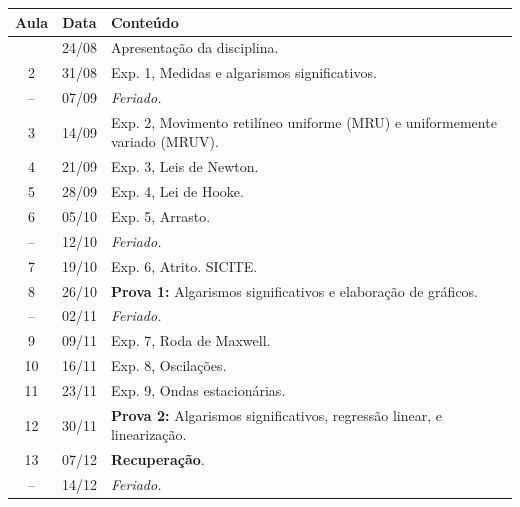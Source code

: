 \begin{center}
\begin{longtable}{ccp{70mm}}
\toprule
Aula & Data & Conteúdo \\
\midrule
\endhead
\bottomrule
\endfoot
  1 & 24/08 & Apresentação da disciplina. \\
  2 & 31/08 & Exp. 1, Medidas e algarismos significativos. \\
 -- & 07/09 & \emph{Feriado.} \\
  3 & 14/09 & Exp. 2, Movimento retilíneo uniforme (MRU) e uniformemente variado (MRUV). \\
  4 & 21/09 & Exp. 3, Leis de Newton. \\
  5 & 28/09 & Exp. 4, Lei de Hooke. \\
  6 & 05/10 & Exp. 5, Arrasto. \\
 -- & 12/10 & \emph{Feriado.} \\
  7 & 19/10 & Exp. 6, Atrito. SICITE. \\
  8 & 26/10 & \textbf{Prova 1:} Algarismos significativos e elaboração de gráficos. \\
 -- & 02/11 & \emph{Feriado.} \\ 
  9 & 09/11 & Exp. 7, Roda de Maxwell. \\
 10 & 16/11 & Exp. 8, Oscilações. \\
 11 & 23/11 & Exp. 9, Ondas estacionárias. \\
 12 & 30/11 & \textbf{Prova 2:} Algarismos significativos, regressão linear, e linearização. \\
 13 & 07/12 & \textbf{Recuperação}. \\
 -- & 14/12 & \emph{Feriado.}\\
\end{longtable}
\end{center}


\cleardoublepage
